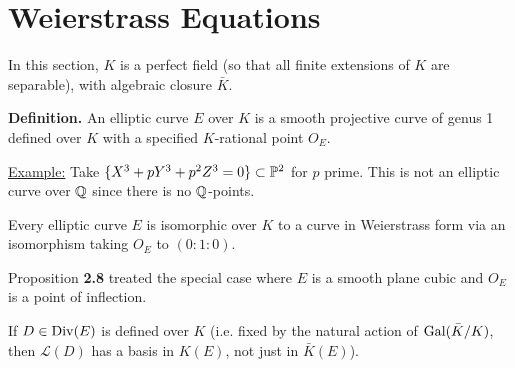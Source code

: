 \documentclass[10pt,a4paper]{article}
\begin{document}
\section{Weierstrass Equations}
In this section, $K$ is a perfect field (so that all finite extensions of $K$ are separable), with algebraic closure $\bar{K}$.

\textbf{Definition.} An elliptic curve $E$ over $K$ is a smooth projective curve of genus 1 defined over $K$ with a specified $K$-rational point $O_E$.

\underline{Example:} Take $\{X^3+pY^3+p^2Z^3 = 0\} \subset \P^2$ for $p$ prime. This is not an elliptic curve over $\Q$ since there is no $\Q$-points.

\begin{theorem}
  Every elliptic curve $E$ is isomorphic over $K$ to a curve in Weierstrass form via an isomorphism taking $O_E$ to $(0:1:0)$.
\end{theorem}
Proposition \textbf{2.8} treated the special case where $E$ is a smooth plane cubic and $O_E$ is a point of inflection.

If $D \in \Div(E)$ is defined over $K$ (i.e. fixed by the natural action of $\Gal(\bar{K}/K)$, then $\mathscr{L}(D)$ has a basis in $K(E)$, not just in $\bar{K}(E)$).
\end{document}
